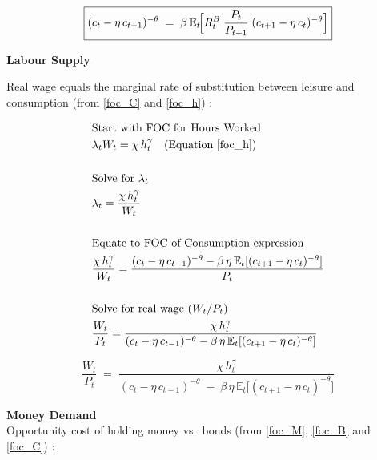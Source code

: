 \documentclass[11pt,preprint]{elsarticle}
\numberwithin{equation}{section}
\numberwithin{figure}{section}
\numberwithin{table}{section}
\begin{document}
\begin{equation}\label{consEuler_app}
\boxed{%
  (c_t - \eta\,c_{t-1})^{-\theta}
  \;=\;
  \beta\,\mathbb{E}_t\!\Bigl[
    R_t^B \;\frac{P_t}{P_{t+1}}\;(c_{t+1} - \eta\,c_t)^{-\theta}
  \Bigr]
}
\end{equation}

\textbf{Labour Supply}

Real wage equals the marginal rate of substitution between leisure and
consumption (from \eqref{foc_C} and \eqref{foc_h}) :

\begin{align*}
& \text{Start with FOC for Hours Worked} \\
& \lambda_t W_t = \chi\,h_t^{\gamma} \quad \text{(Equation \ref{foc_h})} \\
& \\
& \text{Solve for } \lambda_t \\
& \lambda_t = \frac{\chi\,h_t^{\gamma}}{W_t} \\
& \\
& \text{Equate to FOC of Consumption expression} \\
& \frac{\chi\,h_t^{\gamma}}{W_t} = \frac{(c_t - \eta\,c_{t-1})^{-\theta} - \beta\,\eta\,\mathbb{E}_t[(c_{t+1} - \eta\,c_t)^{-\theta}]}{P_t} \\
& \\
& \text{Solve for real wage } (W_t/P_t) \\
& \frac{W_t}{P_t} = \frac{\chi\,h_t^{\gamma}}{(c_t - \eta\,c_{t-1})^{-\theta} - \beta\,\eta\,\mathbb{E}_t[(c_{t+1} - \eta\,c_t)^{-\theta}]}
\end{align*}

\begin{equation}\label{labourSupply_app}
\boxed{
  \frac{W_t}{P_t}
  \;=\;
  \frac{\chi\,h_t^{\gamma}}
       {(c_t - \eta\,c_{t-1})^{-\theta}
        \;-\;
        \beta\,\eta\,\mathbb{E}_t\!\bigl[(c_{t+1} - \eta\,c_t)^{-\theta}\bigr]}
}
\end{equation}

\textbf{Money Demand}\\
Opportunity cost of holding money vs.~bonds (from \eqref{foc_M},
\eqref{foc_B} and \eqref{foc_C}) :
\end{document}
